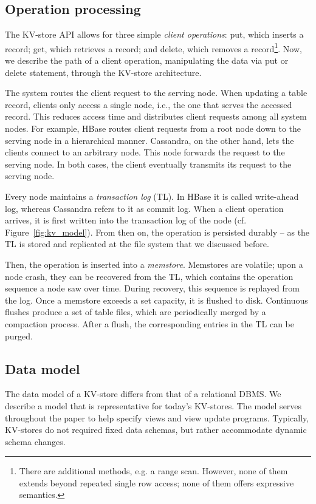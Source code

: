 \subsection{Operation processing}


The KV-store API allows for three simple \textit{client operations}: put, which
inserts a record; get, which retrieves a record; and delete, which 
removes a record\footnote{There are additional methods, e.g. a range scan. However, none of them extends beyond repeated single 
row access; none of them offers expressive semantics.}. Now, we describe the path 
of a client operation, manipulating the data via put or delete statement, through 
the KV-store architecture.


The system routes the client request to the serving
node. When updating a table record, clients only access a single node,
i.e., the one that serves the accessed record. This reduces access
time and distributes client requests among all system nodes. For
example, HBase routes client requests from a root node down to the
serving node in a hierarchical manner. Cassandra, on the other hand,
lets the clients connect to an arbitrary node. This node forwards the
request to the serving node. In both cases, the client eventually
transmits its request to the serving node.

Every node maintains a \textit{transaction log} (TL). In HBase it is
called write-ahead log, whereas Cassandra refers to it as
commit log. When a client operation arrives, it is first written
into the transaction log of the node (cf. Figure~\ref{fig:kv_model}). From 
then on, the operation is persisted durably -- as the TL is stored and 
replicated at the file system that we discussed before.

Then, the operation is inserted into a
\textit{memstore}.  Memstores are volatile; upon a node crash, they
can be recovered from the TL, which contains the operation sequence a
node saw over time.   During recovery, this sequence is replayed from 
the log. Once a memstore exceeds a set capacity, it is flushed to disk.  
Continuous flushes produce a set of table files, which are periodically 
merged by a compaction process. After a flush, the corresponding entries 
in the TL can be purged. 


\subsection{Data model}

The data model of a KV-store differs from that of a
relational DBMS.  We describe a model that is representative for
today's KV-stores. The model serves throughout the paper to help
specify views and view update programs. Typically, KV-stores do not
required fixed data schemas, but rather accommodate dynamic schema
changes.

